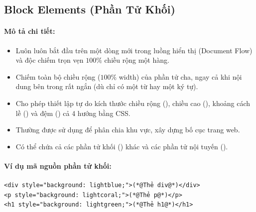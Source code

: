 \subsection{Block Elements (Phần Tử Khối)}

\paragraph{Mô tả chi tiết:}
\begin{itemize}[leftmargin=1.8em, itemsep=3pt, parsep=0pt]
    \item Luôn luôn bắt đầu trên một dòng mới trong luồng hiển thị (Document Flow) và độc chiếm trọn vẹn $100\%$ chiều rộng một hàng.
    \item Chiếm toàn bộ chiều rộng ($100\%$ width) của phần tử cha, ngay cả khi nội dung bên trong rất ngắn (dù chỉ có một từ hay một ký tự).
    \item Cho phép thiết lập tự do kích thước chiều rộng (), chiều cao (), khoảng cách lề () và đệm () cả 4 hướng bằng CSS.
    \item Thường được sử dụng để phân chia khu vực, xây dựng bố cục trang web.
    \item Có thể chứa cả các phần tử khối () khác và các phần tử nội tuyến ().
\end{itemize}

\paragraph{Ví dụ mã nguồn phần tử khối:}
\begin{codeWindow}
\begin{lstlisting}[language=HTML5]
<div style="background: lightblue;">(*@Thẻ div@*)</div>
<p style="background: lightcoral;">(*@Thẻ p@*)</p>
<h1 style="background: lightgreen;">(*@Thẻ h1@*)</h1>
\end{lstlisting}
\end{codeWindow}

